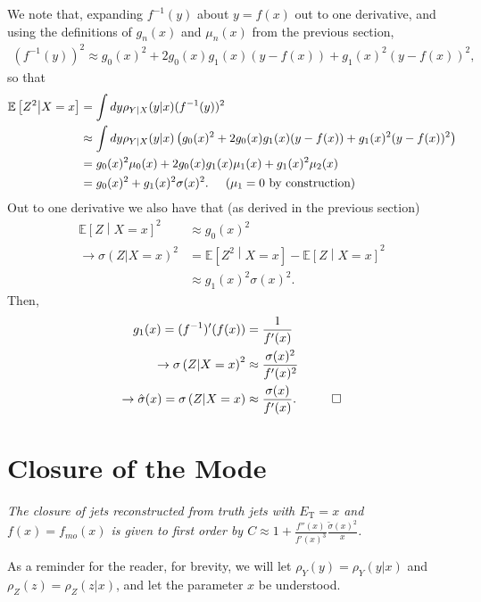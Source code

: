 We note that, expanding $f^{-1}(y)$ about $y=f(x)$ out to one derivative, and using the definitions of $g_n(x)$ and $\mu_n(x)$ from the previous section,
\begin{align}
(f^{-1}(y))^2 \approx g_0(x)^2+2g_0(x)g_1(x)(y-f(x))+g_1(x)^2(y-f(x))^2,
\end{align}
so that
\begin{align}
\mathbb{E}\left[Z^2\middle| X=x\right]&=\int dy \rho_{Y|X}(y|x) (f^{-1}(y))^2\nonumber\\
&\approx\int dy \rho_{Y|X}(y|x) \left(g_0(x)^2+2g_0(x)g_1(x)(y-f(x))+g_1(x)^2(y-f(x))^2\right)\nonumber\\
&=g_0(x)^2\mu_0(x)+2g_0(x)g_1(x)\mu_1(x)+g_1(x)^2\mu_2(x)\nonumber\\
&=g_0(x)^2+g_1(x)^2\sigma(x)^2.\hspace{5mm}\text{($\mu_1=0$ by construction)}
\end{align}
Out to one derivative we also have that (as derived in the previous section)
\begin{align}
\mathbb{E}\left[Z\middle| X=x\right]^2 &\approx g_0(x)^2\nonumber\\
\rightarrow \sigma\left(Z|X=x\right)^2 &= \mathbb{E}\left[Z^2\middle| X=x\right]-\mathbb{E}\left[Z\middle| X=x\right]^2\nonumber\\
&\approx g_1(x)^2\sigma(x)^2.
\end{align}
Then,
\begin{align}
g_1(x) = (f^{-1})'(f(x)) &= \frac{1}{f'(x)}\nonumber\\
\rightarrow \sigma\left(Z|X=x\right)^2 &\approx \frac{\sigma(x)^2}{f'(x)^2}\nonumber\\
\rightarrow \hat{\sigma}(x)=\sigma\left(Z|X=x\right) &\approx \frac{\sigma(x)}{f'(x)}. \hspace{1 cm} \Box \label{eqn:NI:resolution}
\end{align}

\newpage
\section{Closure of the Mode}
\label{sec:NI:calibrated_mode_calculation}
{\it The closure of jets reconstructed from truth jets with $E_\text{T} = x$ and $f(x)=f_{mo}(x)$ is given to first order by $C\approx 1+\frac{f''(x)}{f'(x)^3}\frac{\tilde{\sigma}(x)^2}{x}$.}

\vspace{5mm}

As a reminder for the reader, for brevity, we will let $\rho_Y(y)=\rho_Y(y|x)$ and $\rho_Z(z)=\rho_Z(z|x)$, and let the parameter $x$ be understood.

